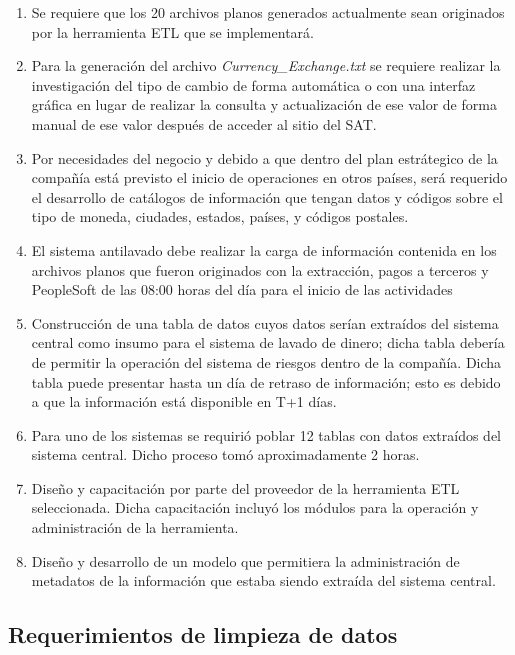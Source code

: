 \begin{enumerate}
\item Se requiere que los 20 archivos planos generados actualmente sean originados por la
  herramienta ETL que se implementará.

\item Para la generación del archivo \textit{Currency\_Exchange.txt} se requiere
  realizar la investigación del tipo de cambio de forma automática o con una
  interfaz gráfica en lugar de realizar la consulta y actualización de ese valor
  de forma manual de ese valor después de acceder al sitio del SAT.

\item Por necesidades del negocio y debido a que dentro del plan estrátegico de
  la compañía está previsto el inicio de operaciones en otros países, será
  requerido el desarrollo de catálogos de información que tengan datos y
  códigos sobre el tipo de moneda, ciudades, estados, países, y códigos
  postales.

\item El sistema antilavado debe realizar la carga de información contenida en
  los archivos planos que fueron originados con la extracción, pagos a terceros
  y PeopleSoft de las 08:00 horas del día para el inicio de las actividades

\item Construcción de una tabla de datos cuyos datos serían extraídos del
  sistema central como insumo para el sistema de lavado de dinero; dicha tabla
  debería de permitir la operación del sistema de riesgos dentro de la
  compañía. Dicha tabla puede presentar hasta un día de retraso de información;
  esto es debido a que la información está disponible en T+1 días.

\item Para uno de los sistemas se requirió poblar 12 tablas con datos extraídos
  del sistema central. Dicho proceso tomó aproximadamente 2 horas.

\item Diseño y capacitación por parte del proveedor de la herramienta ETL
  seleccionada. Dicha capacitación incluyó los módulos para la operación y
  administración de la herramienta.

\item Diseño y desarrollo de un modelo que permitiera la administración de
  metadatos de la información que estaba siendo extraída del sistema central.

\end{enumerate}

\subsection{Requerimientos de limpieza de datos}

